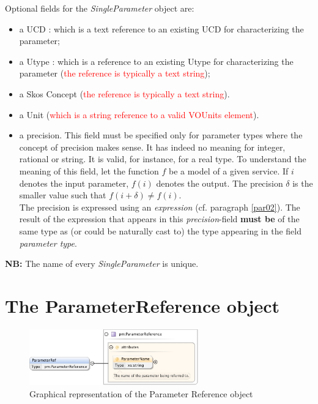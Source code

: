 \documentclass[a4paper,11pt] {ivoa}
\begin{document}
Optional fields for the {\it SingleParameter} object are:
\begin{itemize}
\item a UCD : which is a text reference to an existing UCD for characterizing the parameter;
\item a Utype  : which is a reference to an existing Utype for characterizing the parameter
(\textcolor{red}{the reference is typically a text string});
\item a Skos Concept  (\textcolor{red}{the reference is typically a text string}).
\item a Unit (\textcolor{red}{which is a string reference to a valid VOUnits element}).
\item a precision. This field must be specified only for parameter types where the concept of
precision makes sense. It has indeed no meaning for integer, rational or string. It is valid, for instance, for a real type. To understand the meaning of this field, let the function
$f$ be a model of a given service. If $i$ denotes the input parameter, $f(i)$ denotes the output. The
precision $\delta$ is the smaller value such that $f(i+\delta) \neq f(i)$.\\ The precision is
expressed using an {\it expression} (cf. paragraph \ref{par02}). The result of the expression that
appears in this {\it precision}-field  {\bf must be} of the same type as (or could be naturally
cast to) the type appearing in the field {\it parameter type}.
\end{itemize}

{\bf NB:} The name of every {\it SingleParameter} is unique. 

\section{The ParameterReference object}\label{par-parRef}

\begin{figure}[htbp]
\begin{center}
\includegraphics[width=0.65\textwidth]{pictures/ParameterRef.jpg} 
\caption{Graphical representation of the Parameter Reference object}
\label{Pic-ParameterRef}
\end{center}
\end{figure}
\end{document}
